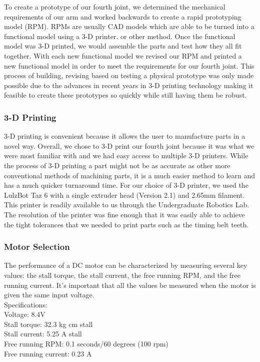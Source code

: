 \noindent To create a prototype of our fourth joint, we determined the mechanical requirements of our arm and worked backwards to create a rapid prototyping model (RPM).  RPMs are usually CAD models which are able to be turned into a functional model using a 3-D printer. or other method.  Once the functional model was 3-D printed, we would assemble the parts and test how they all fit together.  With each new functional model we revised our RPM and printed a new functional model in order to meet the requirements for our fourth joint. This process of building, revising based on testing a physical prototype was only made possible due to the advances in recent years in 3-D printing technology making it feasible to create these prototypes so quickly while still having them be robust. 

\subsubsection{3-D Printing}
3-D printing is convenient because it allows the user to manufacture parts in a novel way. Overall, we chose to 3-D print our fourth joint because it was what we were most familiar with and we had easy access to multiple 3-D printers.  While the process of 3-D printing a part might not be as accurate as other more conventional methods of machining parts, it is a much easier method to learn and has a much quicker turnaround time. For our choice of 3-D printer, we used the LulzBot Taz 6 \cite{Taz6} with a single extruder head (Version 2.1) and 2.65mm filament. This printer is readily available to us through the Undergraduate Robotics Lab. The resolution of the printer was fine enough that it was easily able to achieve the tight tolerances that we needed to print parts such as the timing belt teeth.  


\subsubsection{Motor Selection}

The performance of a DC motor can be characterized by measuring several key values: the stall torque, the stall current, the free running RPM, and the free running current. It's important that all the values be measured when the motor is given the same input voltage.\\

\noindent
Specifications:\\ 
\noindent
\indent Voltage: 8.4V \\
\indent Stall torque: 32.3 kg cm stall \\
\indent Stall current: 5.25 A stall \\
\indent Free running RPM: 0.1 seconds/60 degrees (100 rpm) \\
\indent Free running current: 0.23 A \\





